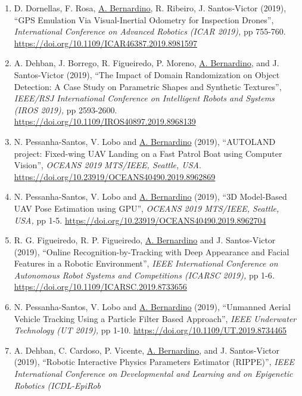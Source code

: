 \documentclass[
]{article}
\begin{document}
\begin{enumerate}
  ``Video Based Live Tracking of Fishes in Tanks'', \emph{International
  Conference on Image Analysis and Recognition (ICIAR 2020),} Lecture
  Notes in Computer Science, Springer, vol 12131, pp 161-173.
  \url{https://doi.org/10.1007/978-3-030-50347-5_15}~
\item
  D. Dornellas, F. Rosa, \ul{A. Bernardino}, R. Ribeiro, J.
  Santos-Victor (2019), ``GPS Emulation Via Visual-Inertial Odometry for
  Inspection Drones'', \emph{International Conference on Advanced
  Robotics (ICAR 2019),} pp 755-760.
  \url{https://doi.org/10.1109/ICAR46387.2019.8981597}~
\item
  A. Dehban, J. Borrego, R. Figueiredo, P. Moreno, \ul{A. Bernardino},
  and J. Santos-Victor (2019), ``The Impact of Domain Randomization on
  Object Detection: A Case Study on Parametric Shapes and Synthetic
  Textures'', \emph{IEEE/RSJ International Conference on Intelligent
  Robots and Systems (IROS 2019),} pp 2593-2600.
  \url{https://doi.org/10.1109/IROS40897.2019.8968139}~
\item
  N. Pessanha-Santos, V. Lobo and \ul{A. Bernardino} (2019), ``AUTOLAND
  project: Fixed-wing UAV Landing on a Fast Patrol Boat using Computer
  Vision'', \emph{OCEANS 2019 MTS/IEEE, Seattle, USA}.
  \url{https://doi.org/10.23919/OCEANS40490.2019.8962869}~
\item
  N. Pessanha-Santos, V. Lobo and \ul{A. Bernardino} (2019), ``3D
  Model-Based UAV Pose Estimation using GPU'', \emph{OCEANS 2019
  MTS/IEEE, Seattle, USA,} pp 1-5.
  \url{https://doi.org/10.23919/OCEANS40490.2019.8962704}~
\item
  R. G. Figueiredo, R. P. Figueiredo, \ul{A. Bernardino} and J.
  Santos-Victor (2019), ``Online Recognition-by-Tracking with Deep
  Appearance and Facial Features in a Robotic Environment'', \emph{IEEE
  International Conference on Autonomous Robot Systems and Competitions
  (ICARSC 2019),} pp 1-6\emph{.}
  \url{https://doi.org/10.1109/ICARSC.2019.8733656}
\item
  N. Pessanha-Santos, V. Lobo and \ul{A. Bernardino} (2019), ``Unmanned
  Aerial Vehicle Tracking Using a Particle Filter Based Approach'',
  \emph{IEEE Underwater Technology (UT 2019),} pp 1-10.
  \url{https://doi.org/10.1109/UT.2019.8734465}~
\item
  A. Dehban, C. Cardoso, P. Vicente, \ul{A. Bernardino}, and J.
  Santos-Victor (2019), ``Robotic Interactive Physics Parameters
  Estimator (RIPPE)'', \emph{IEEE International Conference on
  Developmental and Learning and on Epigenetic Robotics (ICDL-EpiRob
}
\end{enumerate}
\end{document}
